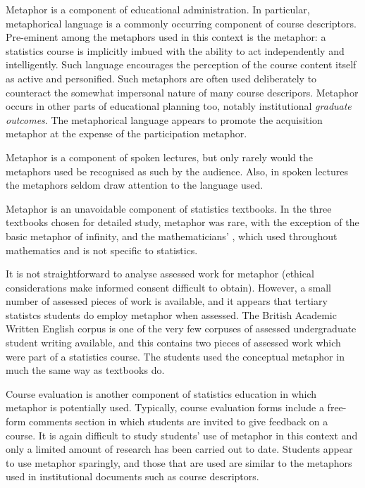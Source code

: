 Metaphor is a component of educational administration.  In particular,
metaphorical language is a commonly occurring component of course
descriptors.  Pre-eminent among the metaphors used in this context is
the  metaphor: a statistics course is implicitly
imbued with the ability to act independently and intelligently.  Such
language encourages the perception of the course content itself as
active and personified.  Such metaphors are often used deliberately to
counteract the somewhat impersonal nature of many course descripors.
Metaphor occurs in other parts of educational planning too, notably
institutional \emph{graduate outcomes}.  The metaphorical language
appears to promote the acquisition metaphor at the expense of the
participation metaphor.

Metaphor is a component of spoken lectures, but only rarely would the
metaphors used be recognised as such by the audience.  Also, in spoken
lectures the metaphors seldom draw attention to the language used.

Metaphor is an unavoidable component of statistics textbooks.  In the
three textbooks chosen for detailed study, metaphor was rare, with the
exception of the basic metaphor of infinity, and the mathematicians'
, which used throughout mathematics and is not specific to
statistics.

It is not straightforward to analyse assessed work for metaphor
(ethical considerations make informed consent difficult to obtain).
However, a small number of assessed pieces of work is available, and
it appears that tertiary statistcs students do employ metaphor when
assessed.  The British Academic Written English corpus is one of the
very few corpuses of assessed undergraduate student writing available,
and this contains two pieces of assessed work which were part of a
statistics course.  The students used the conceptual metaphor
 in much the same way as textbooks do.

Course evaluation is another component of statistics education in
which metaphor is potentially used.  Typically, course evaluation
forms include a free-form comments section in which students are
invited to give feedback on a course.  It is again difficult to study
students' use of metaphor in this context and only a limited amount of
research has been carried out to date.  Students appear to use
metaphor sparingly, and those that are used are similar to the
metaphors used in institutional documents such as course descriptors.


